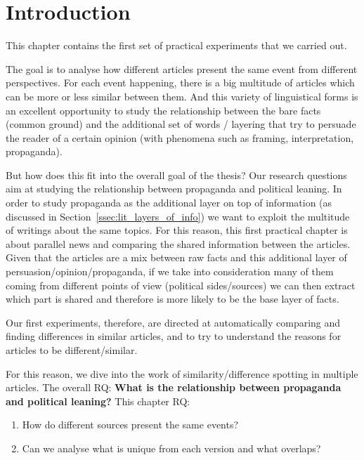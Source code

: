 \section{Introduction}

This chapter contains the first set of practical experiments that we carried out.

The goal is to analyse how different articles present the same event from different perspectives. For each event happening, there is a big multitude of articles which can be more or less similar between them.
And this variety of linguistical forms is an excellent opportunity to study the relationship between the bare facts (common ground) and the additional set of words / layering that try to persuade the reader of a certain opinion (with phenomena such as framing, interpretation, propaganda).

But how does this fit into the overall goal of the thesis? Our research questions aim at studying the relationship between propaganda and political leaning.
In order to study propaganda as the additional layer on top of information
(as discussed in Section~\ref{ssec:lit_layers_of_info})
we want to exploit the multitude of writings about the same topics. For this reason, this first practical chapter is about parallel news and comparing the shared information between the articles.
Given that the articles are a mix between raw facts and this additional layer of persuasion/opinion/propaganda, if we take into consideration many of them coming from different points of view (political sides/sources) we can then extract which part is shared and therefore is more likely to be the base layer of facts. 

Our first experiments, therefore, are directed at automatically comparing and finding differences in similar articles, and to try to understand the reasons for articles to be different/similar.

For this reason, we dive into the work of similarity/difference spotting in multiple articles.
The overall RQ: \textbf{What is the relationship between propaganda and political leaning?}
This chapter RQ: 
\begin{enumerate}
    \item How do different sources present the same events?
    \item Can we analyse what is unique from each version and what overlaps?
\end{enumerate}




